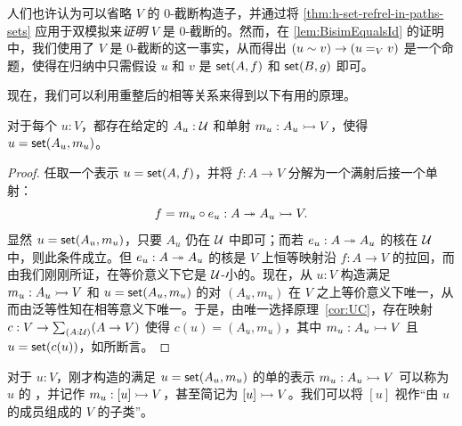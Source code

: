 人们也许认为可以省略 $V$ 的 0-截断构造子，并通过将 \cref{thm:h-set-refrel-in-paths-sets} 应用于双模拟来\emph{证明} $V$ 是 0-截断的。然而，在 \cref{lem:BisimEqualsId} 的证明中，我们使用了 $V$ 是 0-截断的这一事实，从而得出 $(u \sim v)\to (u=_V v)$ 是一个命题，使得在归纳中只需假设 $u$ 和 $v$ 是 $\mathsf{set}(A,f)$ 和 $\mathsf{set}(B,g)$ 即可。

现在，我们可以利用重整后的相等关系来得到以下有用的原理。

\begin{lem}\label{lem:MonicSetPresent}
对于每个 $u:V$，都存在给定的 $A_u:\mathcal{U}$ 和单射 $m_u: A_u \rightarrowtail V$，使得 $u = \mathsf{set}(A_u, m_u)$。
\end{lem}

\begin{proof}
  任取一个表示 $u = \mathsf{set}(A,f)$，并将 $f:A\to V$ 分解为一个满射后接一个单射：
  \begin{equation*}
    f = m_u\circ e_u : A \twoheadrightarrow A_u \rightarrowtail V.
  \end{equation*}
  显然 $u = \mathsf{set}(A_u, m_u)$，只要 $A_u$ 仍在 $\mathcal{U}$ 中即可；而若 $e_u : A \twoheadrightarrow A_u$ 的核在 $\mathcal{U}$ 中，则此条件成立。但 $e_u : A \twoheadrightarrow A_u$ 的核是 $V$ 上恒等映射沿 $f : A\to V$ 的拉回，而由我们刚刚所证，在等价意义下它是 $\mathcal{U}$-小的。现在，从 $u:V$ 构造满足 $m_u :A_u \rightarrowtail V$ 和 $u = \mathsf{set}(A_u, m_u)$ 的对 $(A_u, m_u)$ 在 $V$ 之上等价意义下唯一，从而由泛等性知在相等意义下唯一。于是，由唯一选择原理~\eqref{cor:UC}，存在映射 $c : V\to\sm{A:\UU}(A\to V)$ 使得 $c(u) = (A_u, m_u)$，其中 $m_u :A_u \rightarrowtail V$ 且 $u = \mathsf{set}(c(u))$，如所断言。
\end{proof}

\begin{defn}\label{def:TypeOfElements}
  对于 $u:V$，刚才构造的满足 $u = \mathsf{set}(A_u, m_u)$ 的单的表示 $m_u: A_u \rightarrowtail V$ 可以称为 $u$ 的 
  ，并记作 $m_u : [u] \rightarrowtail V$，甚至简记为 $[u] \rightarrowtail V$。我们可以将 $[u]$ 视作“由 $u$ 的成员组成的 $V$ 的子类”。
\end{defn}

